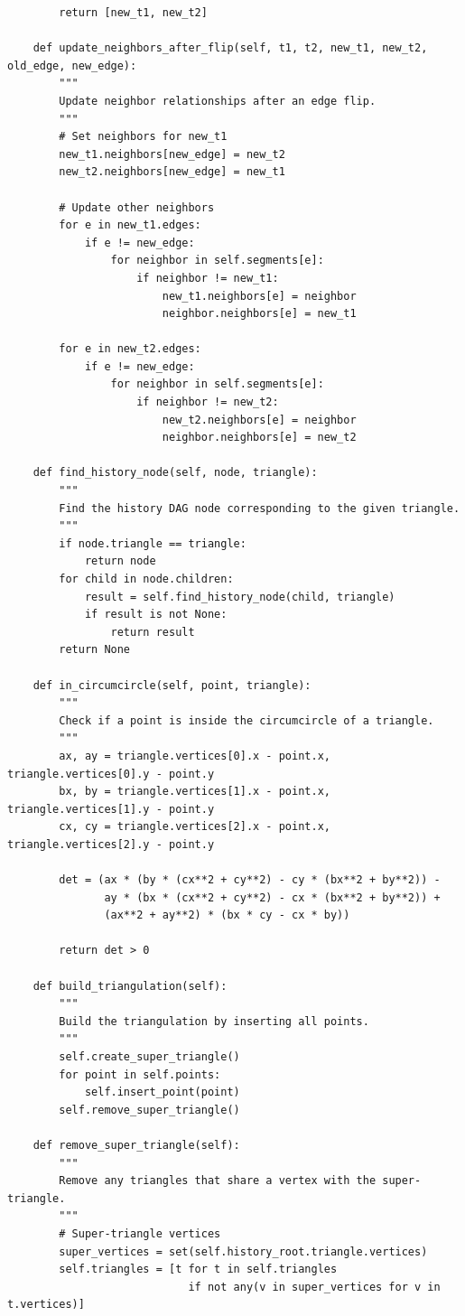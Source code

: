 \documentclass{article}
\begin{document}
\begin{verbatim}
        return [new_t1, new_t2]

    def update_neighbors_after_flip(self, t1, t2, new_t1, new_t2, old_edge, new_edge):
        """
        Update neighbor relationships after an edge flip.
        """
        # Set neighbors for new_t1
        new_t1.neighbors[new_edge] = new_t2
        new_t2.neighbors[new_edge] = new_t1

        # Update other neighbors
        for e in new_t1.edges:
            if e != new_edge:
                for neighbor in self.segments[e]:
                    if neighbor != new_t1:
                        new_t1.neighbors[e] = neighbor
                        neighbor.neighbors[e] = new_t1

        for e in new_t2.edges:
            if e != new_edge:
                for neighbor in self.segments[e]:
                    if neighbor != new_t2:
                        new_t2.neighbors[e] = neighbor
                        neighbor.neighbors[e] = new_t2

    def find_history_node(self, node, triangle):
        """
        Find the history DAG node corresponding to the given triangle.
        """
        if node.triangle == triangle:
            return node
        for child in node.children:
            result = self.find_history_node(child, triangle)
            if result is not None:
                return result
        return None

    def in_circumcircle(self, point, triangle):
        """
        Check if a point is inside the circumcircle of a triangle.
        """
        ax, ay = triangle.vertices[0].x - point.x, triangle.vertices[0].y - point.y
        bx, by = triangle.vertices[1].x - point.x, triangle.vertices[1].y - point.y
        cx, cy = triangle.vertices[2].x - point.x, triangle.vertices[2].y - point.y

        det = (ax * (by * (cx**2 + cy**2) - cy * (bx**2 + by**2)) -
               ay * (bx * (cx**2 + cy**2) - cx * (bx**2 + by**2)) +
               (ax**2 + ay**2) * (bx * cy - cx * by))

        return det > 0

    def build_triangulation(self):
        """
        Build the triangulation by inserting all points.
        """
        self.create_super_triangle()
        for point in self.points:
            self.insert_point(point)
        self.remove_super_triangle()

    def remove_super_triangle(self):
        """
        Remove any triangles that share a vertex with the super-triangle.
        """
        # Super-triangle vertices
        super_vertices = set(self.history_root.triangle.vertices)
        self.triangles = [t for t in self.triangles 
                            if not any(v in super_vertices for v in t.vertices)]


\end{verbatim}
\end{document}
